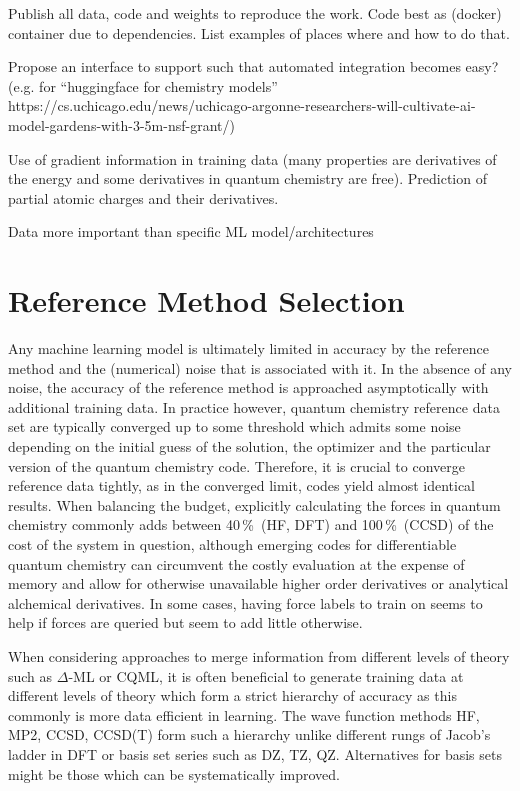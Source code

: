 \documentclass[9pt,bestpractices]{livecoms}
\begin{document}
Publish all data, code and weights to reproduce the work. Code best as (docker) container due to dependencies. List examples of places where and how to do that.

Propose an interface to support such that automated integration becomes easy? (e.g. for “huggingface for chemistry models” https://cs.uchicago.edu/news/uchicago-argonne-researchers-will-cultivate-ai-model-gardens-with-3-5m-nsf-grant/)

Use of gradient information in training data (many properties are derivatives of the energy and some derivatives in quantum chemistry are free). Prediction of partial atomic charges and their derivatives.

Data more important than specific ML model/architectures


\section{Reference Method Selection}
Any machine learning model is ultimately limited in accuracy by the reference method and the (numerical) noise that is associated with it. In the absence of any noise, the accuracy of the reference method is approached asymptotically with additional training data. In practice however, quantum chemistry reference data set are typically converged up to some threshold which admits some noise depending on the initial guess of the solution, the optimizer and the particular version of the quantum chemistry code. Therefore, it is crucial to converge reference data tightly, as in the converged limit, codes yield almost identical results\cite{Lejaeghere2016}. When balancing the budget, explicitly calculating the forces in quantum chemistry commonly adds between 40\,\%\ (HF, DFT) and 100\,\%\ (CCSD) of the cost of the system in question, although emerging codes for differentiable quantum chemistry\cite{TamayoMendoza2018} can circumvent the costly evaluation at the expense of memory and allow for otherwise unavailable higher order derivatives\cite{Abbott2021} or analytical alchemical derivatives\cite{Kasim_2022}. In some cases, having force labels to train on seems to help if forces are queried but seem to add little otherwise\cite{Christensen2020}.

When considering approaches to merge information from different levels of theory such as $\Delta$-ML\cite{Ramakrishnan2015} or CQML\cite{Zaspel2018}, it is often beneficial to generate training data at different levels of theory which form a strict hierarchy of accuracy as this commonly is more data efficient in learning. The wave function methods HF, MP2, CCSD, CCSD(T) form such a hierarchy unlike different rungs of Jacob's ladder in DFT\cite{Perdew2001} or basis set series such as DZ, TZ, QZ. Alternatives for basis sets might be those which can be systematically improved\cite{Lopez2023}.
\end{document}
